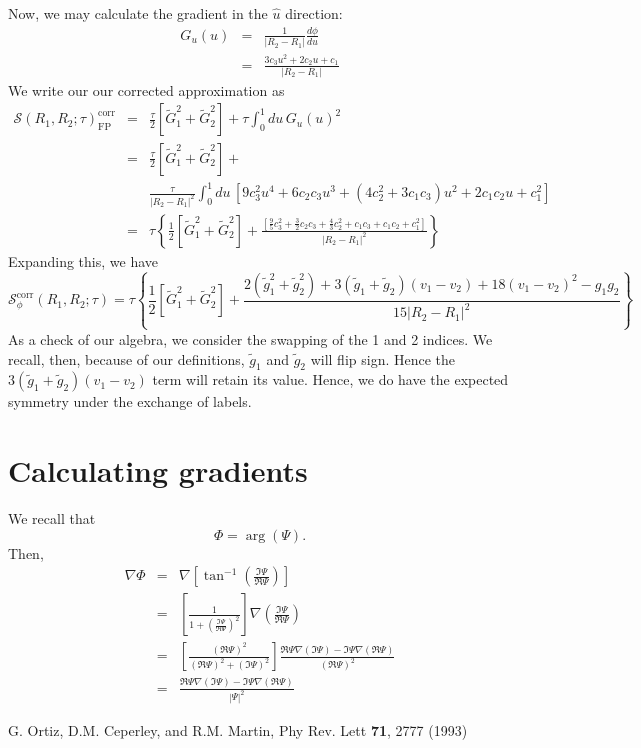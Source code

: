 \documentclass{article}
\begin{document}
Now, we may calculate the gradient in the $\hat{u}$ direction:
\begin{eqnarray}
G_u(u) & = & \frac{1}{|R_2-R_1|} \frac{d\phi}{du} \\
& = & \frac{3c_3 u^2 + 2 c_2 u + c_1}{|R_2-R_1|}
\end{eqnarray}
We write our our corrected approximation as 
\begin{eqnarray}
\mathcal{S}(R_1,R_2;\tau)_\text{FP}^\text{corr} & = &
\frac{\tau}{2} \left[\tilde{G}_1^2 + \tilde{G}_2^2 \right]
+ \tau \int_0^1 du \, G_u(u)^2 \\
 & = & \frac{\tau}{2} \left[\tilde{G}_1^2 + \tilde{G}_2^2 \right]
+ \\
& & \frac{\tau}{|R_2-R_1|^2} \int_0^1 du\, 
\left[9c_3^2u^4 + 6c_2c_3u^3 +(4c_2^2 + 3c_1c_3)u^2 + 2c_1c_2u +
  c_1^2\right] \nonumber \\ 
& = & \tau \left\{ \frac{1}{2} \left[\tilde{G}_1^2 + \tilde{G}_2^2 \right] + \frac{\left[\frac{9}{5} c_3^2 + \frac{3}{2} c_2 c_3 + 
\frac{4}{3} c_2^2 + c_1 c_3 + c_1c_2 + c_1 ^2 \right]}{|R_2-R_1|^2} \right\}
\end{eqnarray}
Expanding this, we have
\begin{equation}
\mathcal{S}^\text{corr}_\phi(R_1, R_2; \tau)
= \tau \left\{
\frac{1}{2}\left[\tilde{G}_1^2 + \tilde{G}_2^2 \right]
+ \frac{2(\tilde{g}_1^2+\tilde{g}_2^2) + 3(\tilde{g}_1 +
  \tilde{g}_2)(v_1-v_2) + 18(v_1-v_2)^2 - g_1
  g_2}{15\left|R_2-R_1\right|^2}
\right\}
\end{equation}
As a check of our algebra, we consider the swapping of the
1 and 2 indices.  We recall, then, because of our definitions, $\tilde{g}_1$
and $\tilde{g}_2$ will flip sign.  Hence the $3(\tilde{g}_1 +
\tilde{g}_2)(v_1-v_2)$ term will retain its value.  Hence, we do have
the expected symmetry under the exchange of labels.

\section{Calculating gradients}
We recall that
\begin{equation}
\Phi = \arg (\Psi).
\end{equation}
Then,
\begin{eqnarray}
\nabla \Phi & = & \nabla \left[ \tan^{-1} \left(\frac{\Im \Psi}{\Re
    \Psi} \right) \right] \\
& = & \left[ \frac{1}{1 + \left(\frac{\Im \Psi}{\Re \Psi}\right)^2}
    \right] \nabla \left( \frac{\Im \Psi}{ \Re \Psi} \right) \\
& = & \left[\frac{(\Re \Psi)^2}{(\Re\Psi)^2 + (\Im \Psi)^2} \right]
\frac{\Re \Psi \nabla(\Im \Psi) - \Im \Psi \nabla (\Re \Psi)}{(\Re
    \Psi)^2} \\
& = & \frac{\Re \Psi \nabla(\Im \Psi) - \Im \Psi \nabla (\Re
    \Psi)}{\left| \Psi \right|^2}
\end{eqnarray}

\begin{thebibliography}{5}
 G. Ortiz, D.M. Ceperley, and R.M. Martin, Phy Rev. Lett {\bf
  71}, 2777 (1993)
\end{thebibliography}
\end{document}

